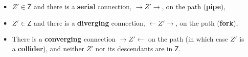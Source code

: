 \documentclass[
  10pt,
  dvipsnames,enabledeprecatedfontcommands]{scrartcl}
\begin{document}
\begin{itemize}

\item $Z' \in \mathsf{Z}$ and there is a \textbf{serial} connection, $\rightarrow Z' \rightarrow$, on the path (\textbf{pipe}),
\item  $Z'\in \mathsf{Z}$ and there is a \textbf{diverging} connection, $\leftarrow Z' \rightarrow $, on the path (\textbf{fork}),
\item There is a \textbf{converging} connection $\rightarrow Z' \leftarrow$ on the path (in which case $Z'$ is a \textbf{collider}), and neither $Z'$ nor its descendants are in $\mathsf{Z}$.
\end{itemize}

\vspace{1mm}

\begin{figure}[H]
\hspace{2mm}\begin{subfigure}[!ht]{0.25\textwidth}


\end{subfigure}
\end{figure}
\end{document}
